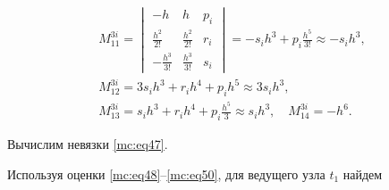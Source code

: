 \begin{gather}

\label{mc:eq52}

M_{11}^{3i}=

\begin{vmatrix}

      -h & h & p_i

   \\

      \frac{h^2}{2!} &   \frac{h^2}{2!} & r_i

   \\

      -\frac{h^3}{3!} &   \frac{h^3}{3!} & s_i

 \end{vmatrix}


   =-s_ih^3+p_i\frac{h^5}{3!}\approx -s_ih^3,

\\

\label{mc:eq54}

  M_{12}^{3i}=3s_ih^3+r_ih^4+p_ih^5\approx 3s_ih^3,

\\

\label{mc:eq54}

  M_{13}^{3i}=s_ih^3+r_ih^4+p_i\frac{h^5}{3}\approx s_ih^3,\quad   M_{14}^{3i}=-h^6.

\end{gather}











Вычислим невязки \eqref{mc:eq47}.

Используя оценки \eqref{mc:eq48}--\eqref{mc:eq50}, для ведущего узла $   t_1$ найдем 

